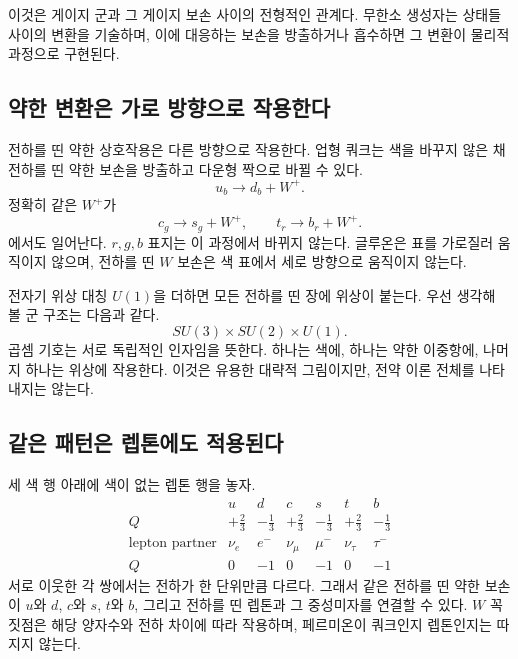 이것은 게이지 군과 그 게이지 보손 사이의 전형적인 관계다. 무한소 생성자는 상태들 사이의 변환을 기술하며, 이에 대응하는 보손을 방출하거나 흡수하면 그 변환이 물리적 과정으로 구현된다.

\subsection{약한 변환은 가로 방향으로 작용한다}

전하를 띤 약한 상호작용은 다른 방향으로 작용한다. 업형 쿼크는 색을 바꾸지 않은 채 전하를 띤 약한 보손을 방출하고 다운형 짝으로 바뀔 수 있다.
\begin{equation}
  u_b\longrightarrow d_b+W^+.
\end{equation}
정확히 같은 \(W^+\)가
\begin{equation}
  c_g\longrightarrow s_g+W^+,
  \qquad
  t_r\longrightarrow b_r+W^+.
\end{equation}
에서도 일어난다. \(r,g,b\) 표지는 이 과정에서 바뀌지 않는다. 글루온은 표를 가로질러 움직이지 않으며, 전하를 띤 \(W\) 보손은 색 표에서 세로 방향으로 움직이지 않는다.

전자기 위상 대칭 \(U(1)\)을 더하면 모든 전하를 띤 장에 위상이 붙는다. 우선 생각해 볼 군 구조는 다음과 같다.
\begin{equation}
  SU(3)\times SU(2)\times U(1).
\end{equation}
곱셈 기호는 서로 독립적인 인자임을 뜻한다. 하나는 색에, 하나는 약한 이중항에, 나머지 하나는 위상에 작용한다. 이것은 유용한 대략적 그림이지만, 전약 이론 전체를 나타내지는 않는다.

\subsection{같은 패턴은 렙톤에도 적용된다}

세 색 행 아래에 색이 없는 렙톤 행을 놓자.
\begin{equation}
\begin{array}{c|cc|cc|cc}
 &u&d&c&s&t&b\\ \hline
Q&+\frac23&-\frac13&+\frac23&-\frac13&+\frac23&-\frac13\\
\text{lepton partner}
 &\nu_e&e^-&\nu_\mu&\mu^-&\nu_\tau&\tau^-\\
Q&0&-1&0&-1&0&-1
\end{array}
\end{equation}
서로 이웃한 각 쌍에서는 전하가 한 단위만큼 다르다. 그래서 같은 전하를 띤 약한 보손이 \(u\)와 \(d\), \(c\)와 \(s\), \(t\)와 \(b\), 그리고 전하를 띤 렙톤과 그 중성미자를 연결할 수 있다. \(W\) 꼭짓점은 해당 양자수와 전하 차이에 따라 작용하며, 페르미온이 쿼크인지 렙톤인지는 따지지 않는다.

